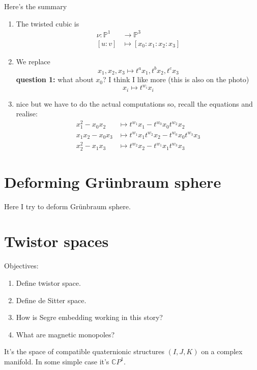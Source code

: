 Here's the summary
\begin{enumerate}
\item The twisted cubic is
	\begin{align*}
		\nu: \mathbb{P}^1 &\longrightarrow \mathbb{P}^3 \\
		[u:v] &\longmapsto [x_0:x_1:x_2:x_3]
	\end{align*}
\item We replace
	\[x_1,x_2,x_3\longmapsto t^a x_1, t^bx_2, t^c x_3\]
\textbf{question 1:} what about \(x_0\)? I think I like more (this is also on the photo)
\[x_i \longmapsto t^{w_i}x_i\]
\item nice but we have to do the actual computations so, recall the equations and realise:
	\begin{align*}
	x_1^2-x_0x_2&\longmapsto t^{w_1}x_1-t^{w_0}x_0t^{w_2}x_2\\
	x_1x_2-x_0x_3&\longmapsto t^{w_1}x_1t^{w_2}x_2-t^{w_0}x_0t^{w_3}x_3\\
	x_2^2-x_1x_3 &\longmapsto t^{w_2}x_2-t^{w_1}x_1t^{w_3}x_3
	\end{align*}
\end{enumerate}


\section{Deforming Grünbraum sphere}
\label{section-grunbaum-sphere}

Here I try to deform Grünbraum sphere.

\section{Twistor spaces}
\label{section-twistor-spaces}

Objectives:
\begin{enumerate}
\item Define twistor space.
\item Define de Sitter space.
\item How is Segre embedding working in this story?
\item What are magnetic monopoles?
\end{enumerate}

\begin{definition}
\label{definition-twistor-space}
It's the space of compatible quaternionic structures $(I,J,K)$ on a complex
manifold. In some simple case it's $\mathbb{C}P^{1}$.
\end{definition}


